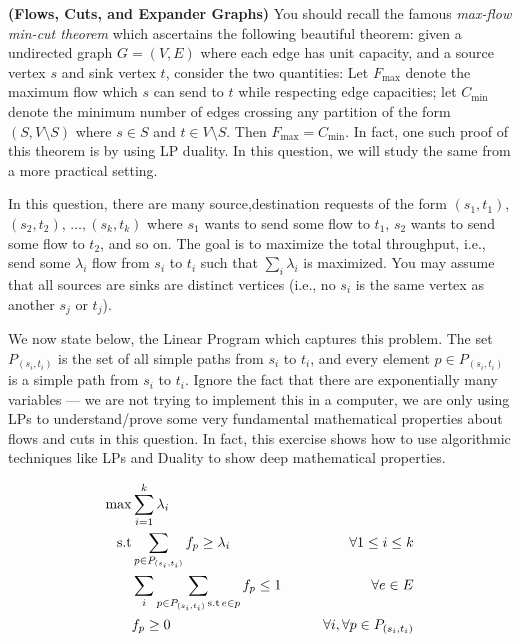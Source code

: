 \documentclass[solution,addpoints,12pt]{exam}
\begin{document}
\begin{questions}

\question[25] \textbf{(Flows, Cuts, and Expander Graphs)}
You should recall the famous \emph{max-flow min-cut theorem} which ascertains the following beautiful theorem: given a undirected graph $G = (V,E)$ where each edge has unit capacity, and a source vertex $s$ and sink vertex $t$, consider the two quantities: Let $F_{\max}$ denote the maximum flow which $s$ can send to $t$ while respecting edge capacities; let $C_{\min}$ denote the minimum number of edges crossing any partition of the form $(S,V\setminus S)$ where $s \in S$ and $t \in V \setminus S$. Then $F_{\max} = C_{\min}$. In fact, one such proof of this theorem is by using LP duality. In this question, we will study the same from a more practical setting.

In this question, there are many source,destination requests of the form $(s_1, t_1)$, $(s_2, t_2)$, $\ldots, (s_k, t_k)$ where $s_1$ wants to send some flow to $t_1$, $s_2$ wants to send some flow to $t_2$, and so on. The goal is to maximize the total throughput, i.e., send some $\lambda_i$ flow from $s_i$ to $t_i$ such that $\sum_{i} \lambda_i$ is maximized. You may assume that all sources are sinks are distinct vertices (i.e., no $s_i$ is the same vertex as another $s_j$ or $t_j$).

We now state below, the Linear Program which captures this problem. The set $P_{(s_i,t_i)}$ is the set of all simple paths from $s_i$ to $t_i$, and every element $p \in P_{(s_i,t_i)}$ is a simple path from $s_i$ to $t_i$. Ignore the fact that there are exponentially many variables --- we are not trying to implement this in a computer, we are only using LPs to understand/prove some very fundamental mathematical properties about flows and cuts in this question. In fact, this exercise shows how to use algorithmic techniques like LPs and Duality to show deep mathematical properties.

\begin{alignat*}{2}
\max  & \sum_{i=1}^{k} \lambda_i \\
\text{s.t}  & \sum_{p \in P_{(s_i,t_i)}} f_p \geq \lambda_i & \qquad  \forall 1 \leq i \leq k  \\
  & \sum_{i} \sum_{p \in P_{(s_i,t_i)} \, {\rm s.t } \, e \in p} f_p  \leq 1 & \qquad \forall e \in E \\
  & f_p \geq 0 & \qquad \forall i, \forall p \in P_{(s_i,t_i)}
\end{alignat*}


\end{questions}
\end{document}

